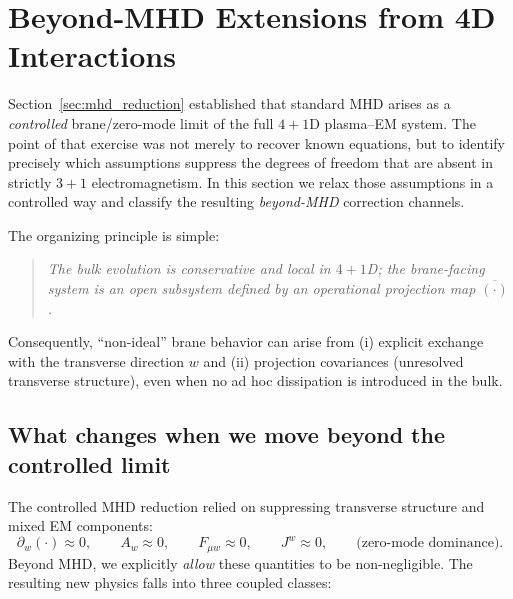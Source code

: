 \documentclass[11pt]{article}
\begin{document}
\section{Beyond-MHD Extensions from 4D Interactions}
\label{sec:beyond_mhd}

Section~\ref{sec:mhd_reduction} established that standard MHD arises as a \emph{controlled}
brane/zero-mode limit of the full \(4+1\)D plasma--EM system. The point of that exercise
was not merely to recover known equations, but to identify precisely which assumptions
suppress the degrees of freedom that are absent in strictly \(3+1\) electromagnetism.
In this section we relax those assumptions in a controlled way and classify the resulting
\emph{beyond-MHD} correction channels.

The organizing principle is simple:
\begin{quote}
\emph{The bulk evolution is conservative and local in \(4+1\)D; the brane-facing system is an
open subsystem defined by an operational projection map \(\overline{(\cdot)}\).}
\end{quote}
Consequently, ``non-ideal'' brane behavior can arise from
(i) explicit exchange with the transverse direction \(w\) and
(ii) projection covariances (unresolved transverse structure),
even when no ad hoc dissipation is introduced in the bulk.

\subsection{What changes when we move beyond the controlled limit}
\label{sec:beyond_mhd_channels}

The controlled MHD reduction relied on suppressing transverse structure and mixed EM components:
\begin{equation}
\partial_w(\cdot)\approx 0,
\qquad
A_w\approx 0,
\qquad
F_{\mu w}\approx 0,
\qquad
J^w\approx 0,
\qquad
\text{(zero-mode dominance)}.
\label{eq:controlled_limit_suppression_recall}
\end{equation}
Beyond MHD, we explicitly \emph{allow} these quantities to be non-negligible. The resulting
new physics falls into three coupled classes:
\end{document}
